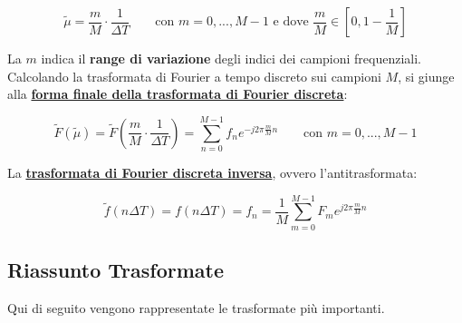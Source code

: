 \documentclass[a4paper]{article}
\begin{document}
	\begin{equation*}
		\tilde{\mu} = \dfrac{m}{M} \cdot \dfrac{1}{\Delta T} \hspace{2em} \text{con } m = 0, ..., M-1 \text{ e dove } \dfrac{m}{M} \in \left[0,1 - \dfrac{1}{M}\right]
	\end{equation*}

	\noindent
	La $m$ indica il \textbf{range di variazione} degli indici dei campioni frequenziali. Calcolando la trasformata di Fourier a tempo discreto sui campioni $M$, si giunge alla \textcolor{Red3}{\textbf{\underline{forma finale della trasformata di Fourier discreta}}}:
	
	\begin{equation*}
		\tilde{F}\left(\tilde{\mu}\right) = \tilde{F}\left(\dfrac{m}{M} \cdot \dfrac{1}{\Delta T}\right) = \sum_{n = 0}^{M - 1} f_{n} e^{-j 2 \pi \frac{m}{M} n} \hspace{2em} \text{con } m = 0, ..., M - 1
	\end{equation*}

	\noindent
	La \textcolor{Red3}{\textbf{\underline{trasformata di Fourier discreta inversa}}}, ovvero l'antitrasformata:
	
	\begin{equation*}
		\tilde{f}\left(n \Delta T\right) = f\left(n \Delta T\right) = f_{n} = \dfrac{1}{M} \sum_{m = 0}^{M - 1} F_{m} e^{j 2 \pi \frac{m}{M} n}
	\end{equation*}

	\newpage
	
	\subsection{Riassunto Trasformate}
	
	Qui di seguito vengono rappresentate le trasformate più importanti.
	
\end{document}
